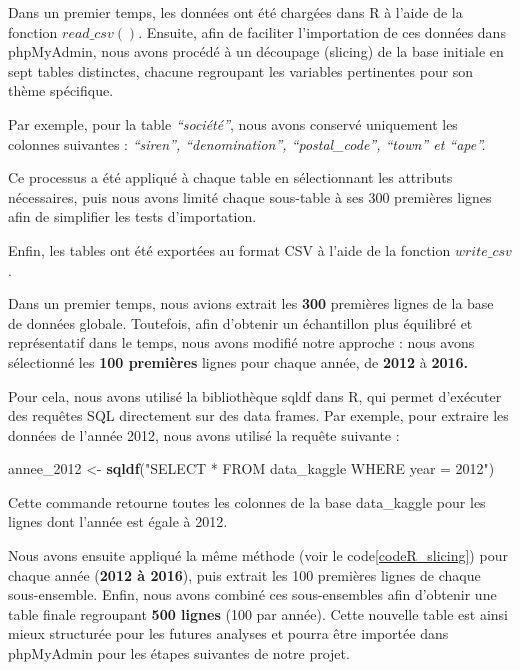 \documentclass[mstat,12pt]{unswthesis}
\newenvironment{Shaded}{\begin{snugshade}}{\end{snugshade}}
\newcommand{\FunctionTok}[1]{\textcolor[rgb]{0.13,0.29,0.53}{\textbf{#1}}}
\newcommand{\NormalTok}[1]{#1}
\newcommand{\OtherTok}[1]{\textcolor[rgb]{0.56,0.35,0.01}{#1}}
\newcommand{\StringTok}[1]{\textcolor[rgb]{0.31,0.60,0.02}{#1}}
\begin{document}
\bigskip

Dans un premier temps, les données ont été chargées dans R à l'aide de
la fonction \(read\_csv()\). Ensuite, afin de faciliter l'importation de
ces données dans phpMyAdmin, nous avons procédé à un découpage (slicing)
de la base initiale en sept tables distinctes, chacune regroupant les
variables pertinentes pour son thème spécifique.

\medskip

Par exemple, pour la table \emph{``société''}, nous avons conservé
uniquement les colonnes suivantes : \emph{``siren'', ``denomination'',
``postal\_code'', ``town'' et ``ape''.}

Ce processus a été appliqué à chaque table en sélectionnant les
attributs nécessaires, puis nous avons limité chaque sous-table à ses
300 premières lignes afin de simplifier les tests d'importation.

\medskip

Enfin, les tables ont été exportées au format CSV à l'aide de la
fonction \(write\_csv\).

\medskip

Dans un premier temps, nous avions extrait les \textbf{300} premières
lignes de la base de données globale. Toutefois, afin d'obtenir un
échantillon plus équilibré et représentatif dans le temps, nous avons
modifié notre approche : nous avons sélectionné les \textbf{100
premières} lignes pour chaque année, de \textbf{2012} à \textbf{2016.}

\medskip

Pour cela, nous avons utilisé la bibliothèque sqldf dans R, qui permet
d'exécuter des requêtes SQL directement sur des data frames. Par
exemple, pour extraire les données de l'année 2012, nous avons utilisé
la requête suivante :

\begin{Shaded}
\begin{Highlighting}[]
\NormalTok{annee\_2012 }\OtherTok{\textless{}{-}} \FunctionTok{sqldf}\NormalTok{(}\StringTok{"SELECT * FROM data\_kaggle WHERE year = 2012"}\NormalTok{)}
\end{Highlighting}
\end{Shaded}

\medskip

Cette commande retourne toutes les colonnes de la base data\_kaggle pour
les lignes dont l'année est égale à 2012.

\medskip

Nous avons ensuite appliqué la même méthode (voir le
code\ref{codeR_slicing}) pour chaque année (\textbf{2012 à 2016}), puis
extrait les 100 premières lignes de chaque sous-ensemble. Enfin, nous
avons combiné ces sous-ensembles afin d'obtenir une table finale
regroupant \textbf{500 lignes} (100 par année). Cette nouvelle table est
ainsi mieux structurée pour les futures analyses et pourra être importée
dans phpMyAdmin pour les étapes suivantes de notre projet.
\end{document}
